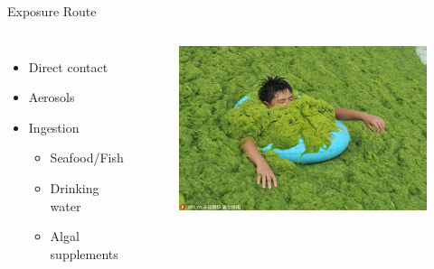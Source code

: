 \begin{frame}{Exposure Route}
	\begin{columns}
	\begin{itemize}
		\item Direct contact
		\item Aerosols
		\item Ingestion
		\begin{itemize}
			\item Seafood/Fish 
			\item Drinking water
			\item Algal supplements
		\end{itemize}
	\end{itemize}
	\begin{figure}
		\includegraphics[scale=0.2]{swim.jpg}
	\end{figure}
\end{columns}
\end{frame}
